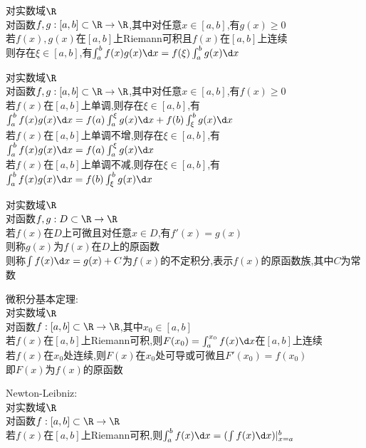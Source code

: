 \begin{dingli}
对实数域$\R$\\
对函数$f,g:[a,b]\subset \R \to \R$,其中对任意$x\in[a,b]$,有$g(x)\geq 0$\\
若$f(x),g(x)$在$[a,b]$上Riemann可积且$f(x)$在$[a,b]$上连续\\
则存在$\xi\in[a,b]$,有$\int_{a}^{b}f(x)g(x)\d x=f(\xi)\int_{a}^{b}g(x)\d x$
\end{dingli}

\begin{dingli}
对实数域$\R$\\
对函数$f,g:[a,b]\subset \R \to \R$,其中对任意$x\in[a,b]$,有$f(x)\geq 0$\\
若$f(x)$在$[a,b]$上单调,则存在$\xi\in[a,b]$,有$\int_{a}^{b}f(x)g(x)\d x=f(a)\int_{a}^{\xi}g(x)\d x+f(b)\int_{\xi}^{b}g(x)\d x$\\
若$f(x)$在$[a,b]$上单调不增,则存在$\xi\in[a,b]$,有$\int_{a}^{b}f(x)g(x)\d x=f(a)\int_{a}^{\xi}g(x)\d x$\\
若$f(x)$在$[a,b]$上单调不减,则存在$\xi\in[a,b]$,有$\int_{a}^{b}f(x)g(x)\d x=f(b)\int_{\xi}^{b}g(x)\d x$
\end{dingli}

\begin{dingyi}
对实数域$\R$\\
对函数$f,g:D\subset \R \to \R$\\
若$f(x)$在$D$上可微且对任意$x\in D$,有$f'(x)=g(x)$\\
则称$g(x)$为$f(x)$在$D$上的原函数\\
则称$\int f(x)\d x=g(x)+C$为$f(x)$的不定积分,表示$f(x)$的原函数族,其中$C$为常数
\end{dingyi}

\begin{dingli}
微积分基本定理:\\
对实数域$\R$\\
对函数$f:[a,b]\subset \R \to \R$,其中$x_0\in[a,b]$\\
若$f(x)$在$[a,b]$上Riemann可积,则$F(x_0)=\int_{a}^{x_0}f(x)\d x$在$[a,b]$上连续\\
若$f(x)$在$x_0$处连续,则$F(x)$在$x_0$处可导或可微且$F'(x_0)=f(x_0)$\\
即$F(x)$为$f(x)$的原函数
\end{dingli}

\begin{dingli}
Newton-Leibniz:\\
对实数域$\R$\\
对函数$f:[a,b]\subset \R \to \R$\\
若$f(x)$在$[a,b]$上Riemann可积,则$\int_{a}^{b}f(x)\d x=(\int f(x)\d x)|_{x=a}^{b}$
\end{dingli}

